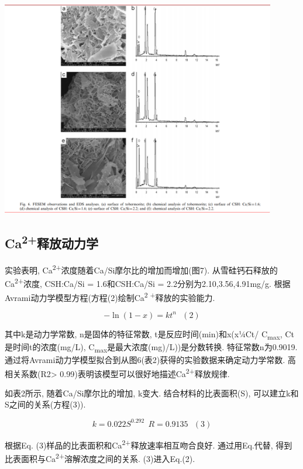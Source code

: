 \documentclass[11pt]{article}
\begin{document}
\includegraphics[width=0.9\textwidth]{fig.6.png}
 \label{tab:title}

\subsection{Ca\textsuperscript{2+}释放动力学}
\label{sec:org59b7516}
实验表明, Ca\textsuperscript{2+}浓度随着Ca/Si摩尔比的增加而增加(图7). 从雪硅钙石释放的
Ca\textsuperscript{2+}浓度, CSH:Ca/Si = 1.6和CSH:Ca/Si = 2.2分别为2.10,3.56,4.91mg/g.
根据Avrami动力学模型方程(方程(2)绘制Ca\textsuperscript{2 +}释放的实验能力.\cite{demirkıran07_dissol_kinet_ulexit_perch_acid_solut}

\[-\ln(1-x) = kt^{n} \ \ \ (2)\]

其中k是动力学常数, n是固体的特征常数, t是反应时间(min)和x(x¼Ct/ C\textsubscript{max}, Ct是时间t的浓度(mg/L), C\textsubscript{max}是最大浓度(mg)/L))是分数转换. 特征常数n为0.9019. 通过将Avrami动力学模型拟合到从图6(表2)获得的实验数据来确定动力学常数. 高相关系数(R2> 0.99)表明该模型可以很好地描述Ca\textsuperscript{2+}释放规律.


如表2所示, 随着Ca/Si摩尔比的增加, k变大. 结合材料的比表面积(S), 可以建立k和S之间的关系(方程(3)).

\[k = 0.022S^{0.292} \ \ R = 0.9135 \ \ \ (3)\]

根据Eq. (3)样品的比表面积和Ca\textsuperscript{2+}释放速率相互吻合良好. 通过用Eq.代替, 得到比表面积与Ca\textsuperscript{2+}溶解浓度之间的关系. (3)进入Eq.(2).
\end{document}
